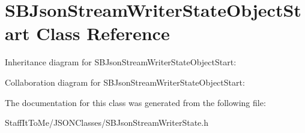 \hypertarget{interface_s_b_json_stream_writer_state_object_start}{
\section{\-S\-B\-Json\-Stream\-Writer\-State\-Object\-Start \-Class \-Reference}
\label{interface_s_b_json_stream_writer_state_object_start}
}


\-Inheritance diagram for \-S\-B\-Json\-Stream\-Writer\-State\-Object\-Start\-:


\-Collaboration diagram for \-S\-B\-Json\-Stream\-Writer\-State\-Object\-Start\-:


\-The documentation for this class was generated from the following file\-:\begin{DoxyCompactItemize}
\item 
\-Staff\-It\-To\-Me/\-J\-S\-O\-N\-Classes/\-S\-B\-Json\-Stream\-Writer\-State.\-h\end{DoxyCompactItemize}
